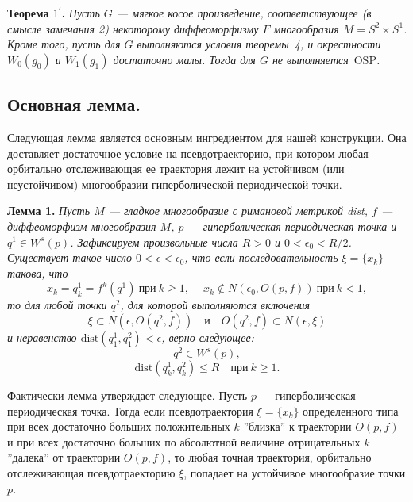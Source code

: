 \documentclass[12pt]{article}
\begin{document}
\textbf{Теорема $\mbox{1}^{\prime}$.} \textit{Пусть $G$ --- мягкое косое произведение, соответствующее (в смысле замечания 2) некоторому диффеоморфизму $F$ многообразия $M=S^2\times S^1$. Кроме того, пусть для $G$ выполняются условия теоремы~4,
и окрестности $W_0(g_0)$ и $W_1(g_1)$ достаточно малы.
 Тогда для $G$ не выполняется}~OSP\textit{. 
}

\subsection{Основная лемма.}

Следующая лемма является основным ингредиентом для нашей конструкции. 
Она доставляет достаточное условие на псевдотраекторию, при котором любая орбитально отслеживающая ее траектория лежит на устойчивом (или 
неустойчивом) многообразии гиперболической периодической точки.  

\textbf{Лемма 1.}
\textit{
Пусть $M$ --- гладкое многообразие с римановой метрикой dist, $f$ --- диффеоморфизм многообразия $M$, $p$ --- гиперболическая периодическая точка и $q^1\in W^s(p)$. Зафиксируем произвольные числа $R>0$ и $0<\epsilon_0<R/2$. Существует такое число $0<\epsilon<\epsilon_0$, что если последовательность $\xi=\{x_k\}$ такова, что
\begin{equation}
\label{2.3.1}
x_k=q^1_k=f^k(q^1)\ \textrm{при}\ k\geq1,\quad\ x_k\notin N(\epsilon_0,O(p,f))\ \textrm{при}\ k<1,
\end{equation}
то для любой точки $q^2$, для которой выполняются включения
\begin{equation}
\label{2.3.2}
\xi\subset N(\epsilon,O(q^2,f))\quad\textrm{и}\quad O(q^2,f)\subset N(\epsilon,\xi) 
\end{equation}
 и неравенство $\textrm{dist}(q_1^1,q_1^2)<\epsilon$, верно следующее:
\begin{equation}
\label{2.3.3}
q^2\in W^s(p),
\end{equation}
\begin{equation}
\label{2.3.4}
\textrm{dist}(q^1_k,q^2_k)\leq R\quad\textrm{при}\ k\geq1.
\end{equation}
}

Фактически лемма утверждает следующее. Пусть $p$ --- гиперболическая периодическая точка. Тогда если псевдотраектория $\xi=\{x_k\}$ определенного типа при всех достаточно больших положительных $k$ ''близка'' к траектории $O(p,f)$ и при всех достаточно больших по абсолютной величине отрицательных $k$ ''далека'' от траектории $O(p,f)$, то любая точная траектория, орбитально отслеживающая псевдотраекторию $\xi$, попадает на устойчивое многообразие точки $p$.
\end{document}
